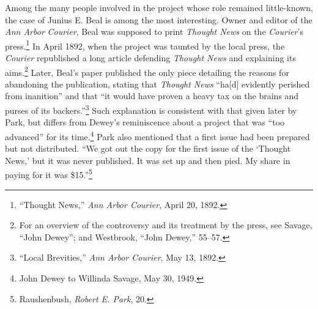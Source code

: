 \documentclass[openany,nobib]{tufte-book}
\begin{document}
Among the many people involved in the project whose role remained
little-known, the case of Junius E. Beal is among the most interesting.
Owner and editor of the \emph{Ann Arbor} \emph{Courier}, Beal was
supposed to print \emph{Thought News} on the \emph{Courier}'s
press.\footnote{``Thought News,'' \emph{Ann Arbor Courier}, April 20,
  1892.} In April 1892, when the project was taunted by the local press,
the \emph{Courier} republished a long article defending \emph{Thought
News} and explaining its aims.\footnote{For an overview of the
  controversy and its treatment by the press, see Savage, ``John
  Dewey''; and Westbrook, ``John Dewey,'' 55--57.} Later, Beal's paper
published the only piece detailing the reasons for abandoning the
publication, stating that \emph{Thought News} ``ha{[}d{]} evidently
perished from inanition'' and that ``it would have proven a heavy tax on
the brains and purses of its backers.''\footnote{``Local Brevities,''
  \emph{Ann Arbor Courier}, May 13, 1892.} Such explanation is
consistent with that given later by Park, but differs from Dewey's
reminiscence about a project that was ``too advanced'' for its
time.\footnote{John Dewey to Willinda Savage, May 30, 1949.} Park also
mentioned that a first issue had been prepared but not distributed. ``We
got out the copy for the first issue of the `Thought News,' but it was
never published. It was set up and then pied. My share in paying for it
was \$15.''\footnote{Raushenbush, \emph{Robert E. Park}, 20.}
\end{document}
